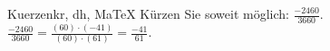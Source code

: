 \begin{MAufgabe}{Kuerzen}{kr, dh, MaTeX}
K\"urzen Sie soweit m\"oglich: $\frac{-2460}{3660}$.\\ 
\ifLsg\MLoesung
\quad $\frac{-2460}{3660}=\frac{(60)\cdot(-41)}{(60)\cdot(61)}=\frac{-41}{61}$.\else\relax\fi
 \end{MAufgabe}